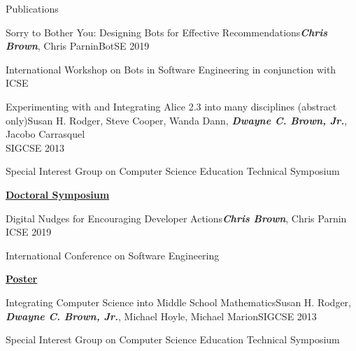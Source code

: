 \documentclass{resume} %
\begin{document}
\begin{rSection}{Publications}
\begin{pSubsection}{Sorry to Bother You: Designing Bots for Effective Recommendations}{}{\textit{\textbf{Chris Brown}}, Chris Parnin}{BotSE 2019}
\item International Workshop on
Bots in Software Engineering in conjunction with ICSE
\end{pSubsection}
\begin{pSubsection}{Experimenting with and Integrating Alice 2.3 into many disciplines (abstract only)}{}{Susan H. Rodger, Steve Cooper, Wanda Dann, \textit{\textbf{Dwayne C. Brown, Jr.}}, Jacobo Carrasquel}{\\ \hspace*{0.83\textwidth} SIGCSE 2013}
\item Special Interest Group on Computer Science Education Technical Symposium
\end{pSubsection}
\textbf{\underline{Doctoral Symposium}}

\begin{pSubsection}{Digital Nudges for Encouraging Developer Actions}{}{\textit{\textbf{Chris Brown}}, Chris Parnin
}{ICSE 2019}
\item International Conference on Software Engineering
\end{pSubsection}
\textbf{\underline{Poster}}

\begin{pSubsection}{Integrating Computer Science into Middle School Mathematics}{}{Susan H. Rodger, \textit{\textbf{Dwayne C. Brown, Jr.}}, Michael Hoyle, Michael Marion}{SIGCSE 2013}
\item Special Interest Group on Computer Science Education Technical Symposium
\end{pSubsection}
\end{rSection}

\end{document}
